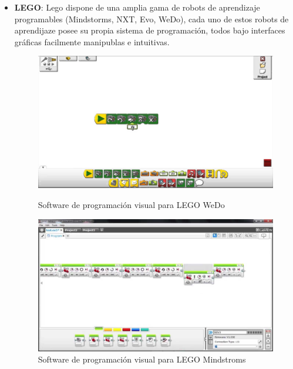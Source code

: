 \begin{itemize}
\item \textbf{LEGO}: Lego dispone de una amplia gama de robots de aprendizaje programables (Mindstorms, NXT, Evo, WeDo), cada uno de estos robots de aprendijaze posee su propia sistema de programación, todos bajo interfaces gráficas facilmente manipublas e intuitivas.\\
\begin{figure}[H]
	\begin{minipage}{0.48\textwidth}
    	\centering
     	\includegraphics[scale=0.15]{img/lego-wedo.jpg}
  		\caption{Software de programación visual para LEGO WeDo}
  		\label{fig:lego-wedo}
   	\end{minipage}\hfill
   	\begin {minipage}{0.48\textwidth}
     	\centering
     	\includegraphics[scale=0.15]{img/lego-mindstorms.jpg}
     	\caption{Software de programación visual para LEGO Mindstroms}
     	\label{fig:lego-mindstorms}
	\end{minipage}
\end{figure}


\end{itemize}
